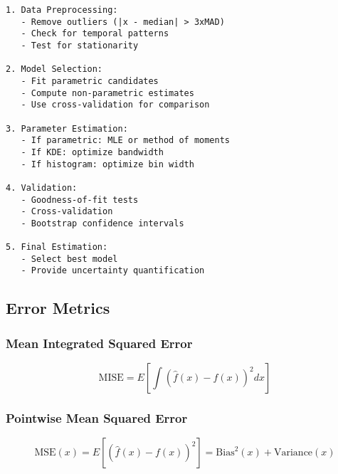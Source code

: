 \documentclass[12pt, xcolor=dvipsnames,svgnames,x11names]{article}
\begin{document}
\begin{lstlisting}[caption=General Workflow for PDF Estimation]
1. Data Preprocessing:
   - Remove outliers (|x - median| > 3xMAD)
   - Check for temporal patterns
   - Test for stationarity

2. Model Selection:
   - Fit parametric candidates
   - Compute non-parametric estimates
   - Use cross-validation for comparison

3. Parameter Estimation:
   - If parametric: MLE or method of moments
   - If KDE: optimize bandwidth
   - If histogram: optimize bin width

4. Validation:
   - Goodness-of-fit tests
   - Cross-validation
   - Bootstrap confidence intervals

5. Final Estimation:
   - Select best model
   - Provide uncertainty quantification
\end{lstlisting}

\subsection{Error Metrics}

\subsubsection{Mean Integrated Squared Error}
\begin{equation}
\text{MISE} = E\left[\int(\hat{f}(x) - f(x))^2 dx\right]
\end{equation}

\subsubsection{Pointwise Mean Squared Error}
\begin{equation}
\text{MSE}(x) = E[(\hat{f}(x) - f(x))^2] = \text{Bias}^2(x) + \text{Variance}(x)
\end{equation}
\end{document}
